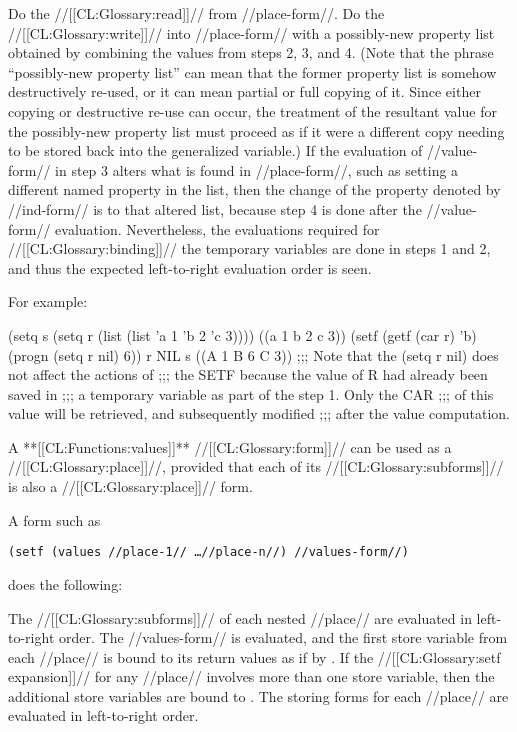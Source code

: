   Do the //[[CL:Glossary:read]]// from //place-form//.   Do the //[[CL:Glossary:write]]// into //place-form// with a possibly-new property list
       obtained by combining the values from steps 2, 3, and 4.   (Note that the phrase ``possibly-new property list'' can mean that 
    the former property list is somehow destructively re-used, or it can 
    mean partial or full copying of it.   Since either copying or destructive re-use can occur,  the treatment of the resultant value for the 
    possibly-new property list must proceed as if it were a different copy
    needing to be stored back into the generalized variable.) \endlist 
    If the evaluation of //value-form//  in step 3 alters what is found in //place-form//, such as setting a different named property in the list,
    then the change of the property denoted by //ind-form//  is to that 
    altered list, because step 4 is done after the  //value-form//
    evaluation.  Nevertheless, the 
    evaluations required for //[[CL:Glossary:binding]]//  the temporary variables  are done in steps 1 and 
    2,  and thus the expected left-to-right evaluation order is seen.

For example:

\code
 (setq s (setq r (list (list 'a 1 'b 2 'c 3)))) \EV ((a 1 b 2 c 3))
 (setf (getf (car r) 'b) 
       (progn (setq r nil) 6)) 
 r \EV NIL
 s \EV ((A 1 B 6 C 3)) ;;; Note that the (setq r nil) does not affect the actions of  ;;; the SETF because the value of R had already been saved in  ;;; a temporary variable as part of the step 1. Only the CAR ;;; of this value will be retrieved, and subsequently modified  ;;; after the value computation. \endcode
  \endlist \endlist
 

\endsubsubsection%

  

A **[[CL:Functions:values]]** //[[CL:Glossary:form]]// can be used as a //[[CL:Glossary:place]]//, provided that each of its //[[CL:Glossary:subforms]]// is also a //[[CL:Glossary:place]]// form.

A form such as

{\tt (setf (values //place-1// \dots //place-n//) //values-form//)}

does the following:

\beginlist {} The //[[CL:Glossary:subforms]]// of each nested //place// are evaluated in left-to-right order.  The //values-form// is evaluated, and the first store variable from each //place// is bound to its return values as if by  .    If the //[[CL:Glossary:setf expansion]]// for any //place//  involves more than one store variable, then the additional store variables are bound to \nil.  The storing forms for each //place// are evaluated in left-to-right order. \endlist

